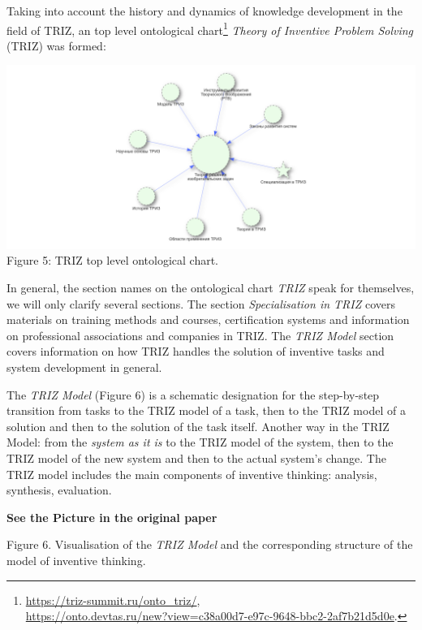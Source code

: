 \documentclass[11pt,a4paper]{article}
\newcommand{\addpicture}{\textbf{See the Picture in the original paper}\par}
\begin{document}
Taking into account the history and dynamics of knowledge development in the
field of TRIZ, an top level ontological
chart\footnote{\url{https://triz-summit.ru/onto_triz/},\\ \url{https://onto.devtas.ru/new?view=c38a00d7-e97c-9648-bbc2-2af7b21d5d0e}. }
\emph{Theory of Inventive Problem Solving} (TRIZ) was formed:
\begin{center}
  \includegraphics[width=.8\textwidth]{5.png}\\
  Figure 5: TRIZ top level ontological chart.
\end{center}
In general, the section names on the ontological chart \emph{TRIZ} speak for
themselves, we will only clarify several sections. The section
\emph{Specialisation in TRIZ} covers materials on training methods and
courses, certification systems and information on professional associations
and companies in TRIZ. The \emph{TRIZ Model} section covers information on how
TRIZ handles the solution of inventive tasks and system development in
general.

The \emph{TRIZ Model} (Figure 6) is a schematic designation for the
step-by-step transition from tasks to the TRIZ model of a task, then to the
TRIZ model of a solution and then to the solution of the task itself.  Another
way in the TRIZ Model: from the \emph{system as it is} to the TRIZ model of
the system, then to the TRIZ model of the new system and then to the actual
system's change.  The TRIZ model includes the main components of inventive
thinking: analysis, synthesis, evaluation.

\begin{center}
  \addpicture
  Figure 6. Visualisation of the \emph{TRIZ Model} and the corresponding 
  structure of the model of inventive thinking.
\end{center}
\end{document}
